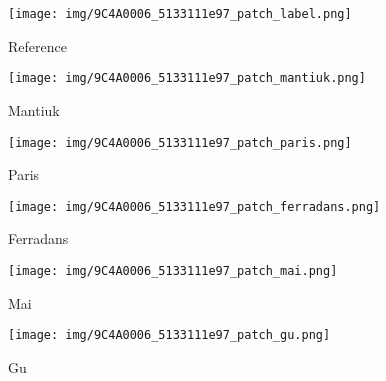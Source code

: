 \documentclass[journal]{IEEEtran}
\begin{document}
\begin{figure*}[h!]
        \centering
        \begin{subfigure}[b]{0.24\textwidth}  
            \centering 
            \texttt{[image: img/9C4A0006\_5133111e97\_patch\_label.png]}
            \caption[]%
            {{\small Reference }}    
            \label{fig:mean and std of net24}
        \end{subfigure}
        \begin{subfigure}[b]{0.24\textwidth}  
            \centering 
            \texttt{[image: img/9C4A0006\_5133111e97\_patch\_mantiuk.png]}
            \caption[]%
            {{\small Mantiuk \cite{mantiuk2008display} }}    
            \label{fig:mean and std of net24}
        \end{subfigure}
        \begin{subfigure}[b]{0.24\textwidth}   
            \centering 
            \texttt{[image: img/9C4A0006\_5133111e97\_patch\_paris.png]}
            \caption[]%
            {{\small Paris \cite{paris2015local} }}    
            \label{fig:mean and std of net34}
        \end{subfigure}
        \begin{subfigure}[b]{0.24\textwidth}   
            \centering 
            \texttt{[image: img/9C4A0006\_5133111e97\_patch\_ferradans.png]}
            \caption[]%
            {{\small Ferradans \cite{ferradans2011analysis}     }}    
            \label{fig:mean and std of net44}
        \end{subfigure}
        \label{fig:mean and std of nets}
        \centering
        \begin{subfigure}[b]{0.24\textwidth}
            \centering
            \texttt{[image: img/9C4A0006\_5133111e97\_patch\_mai.png]}
            \caption[]%
            {{\small Mai \cite{mai2011optimizing} }}    
            \label{fig:mean and std of net14}
        \end{subfigure}
        \begin{subfigure}[b]{0.24\textwidth}
            \centering
            \texttt{[image: img/9C4A0006\_5133111e97\_patch\_gu.png]}
            \caption[]%
            {{\small Gu \cite{gu2013local} }}    
            \label{fig:mean and std of net14}
        \end{subfigure}

\end{figure*}
\end{document}
